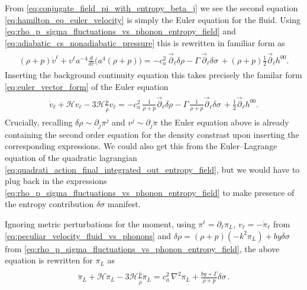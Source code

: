 From \eqref{eq:conjugate_field_pi_with_entropy_beta_j} we see the second equation \eqref{eq:hamilton_eq_euler_velocity} is simply the Euler equation for the fluid.
Using \eqref{eq:rho_p_sigma_fluctuations_vs_phonon_entropy_field} and \eqref{eq:adiabatic_cs_nonadiabatic_pressure} this is rewritten in familiar form as
{\small\begin{align}\label{eq:euler_equation_from_hamiltonian}
\begin{aligned}
    (\rho+p)\dot{v}^\ell +v^\ell a^{-4}\frac{d}{d\tau}\big(a^4(\rho+p)\big) =-c_a^2 \,\vec{\partial}_\ell\delta\rho -\Gamma\, \vec{\partial}_\ell\delta\sigma\,+ (\rho+p) \tfrac12 \vec{\partial}_\ell h^{00}.
\end{aligned}\end{align}}
Inserting the background continuity equation this takes precisely the familar form \eqref{eq:euler_vector_form} of the Euler equation
{\small\begin{align}
\begin{aligned}
    \dot{v}_\ell+ \mathcal{H}v_\ell -3\mathcal{H}\frac{\dot{\bar{p}}}{\dot{\bar{\rho}}}v_\ell=-c_a^2 \,\tfrac{1}{\rho+p}\vec{\partial}_\ell\delta\rho -\Gamma\, \tfrac{1}{\rho+p}\vec{\partial}_\ell\delta\sigma\,+ \tfrac12 \vec{\partial}_\ell h^{00}.
\end{aligned}\end{align}}
Crucially, recalling $\delta\rho \sim \partial_j\pi^j$ and $v^j\sim \partial_j\dot{\pi}$ the Euler equation above is already containing the second order equation for the density constrast upon inserting the corresponding expressions.
We could also get this from the Euler--Lagrange equation of the quadratic lagrangian \eqref{eq:quadrati_action_final_integrated_out_entropy_field}, but we would have to plug back in the expressions \eqref{eq:rho_p_sigma_fluctuations_vs_phonon_entropy_field} to make presence of the entropy contribution $\delta\sigma$ manifest.

{\color{red}
Ignoring metric perturbations for the moment, using $\pi^\ell=\partial_\ell\pi_L$, $v_\ell = -\dot{\pi}_\ell$ from \eqref{eq:peculiar_velocity_fluid_vs_phonons} and $\delta\rho=(\rho+p)(-k^2\pi_L)+by\delta\sigma$ from \eqref{eq:rho_p_sigma_fluctuations_vs_phonon_entropy_field}, the above equation is rewritten for $\pi_L$ as
{\small\begin{align}\label{eq:euler_pi_L}
\begin{aligned}
    \ddot{\pi}_L+ \mathcal{H}\dot{\pi}_L -3\mathcal{H}\frac{\dot{\bar{p}}}{\dot{\bar{\rho}}}\dot{\pi}_L=c_a^2 \,\nabla^2\pi_L +\tfrac{by+\Gamma}{\rho+p}\delta\sigma\,.
\end{aligned}\end{align}}}

